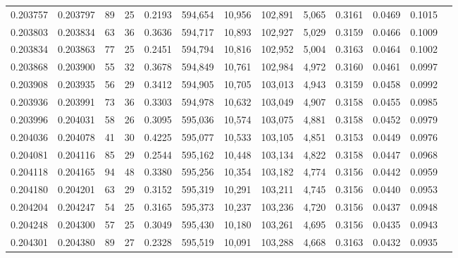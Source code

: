 \begin{tabular}{rrrrrrrrrrrrr}
0.203757 & 0.203797 &    89 &  25 &                                     0.2193 & 594,654 &  10,956 & 102,891 &   5,065 & 0.3161 & 0.0469 & 0.1015 \\
0.203803 & 0.203834 &    63 &  36 &                                     0.3636 & 594,717 &  10,893 & 102,927 &   5,029 & 0.3159 & 0.0466 & 0.1009 \\
0.203834 & 0.203863 &    77 &  25 &                                     0.2451 & 594,794 &  10,816 & 102,952 &   5,004 & 0.3163 & 0.0464 & 0.1002 \\
0.203868 & 0.203900 &    55 &  32 &                                     0.3678 & 594,849 &  10,761 & 102,984 &   4,972 & 0.3160 & 0.0461 & 0.0997 \\
0.203908 & 0.203935 &    56 &  29 &                                     0.3412 & 594,905 &  10,705 & 103,013 &   4,943 & 0.3159 & 0.0458 & 0.0992 \\
0.203936 & 0.203991 &    73 &  36 &                                     0.3303 & 594,978 &  10,632 & 103,049 &   4,907 & 0.3158 & 0.0455 & 0.0985 \\
0.203996 & 0.204031 &    58 &  26 &                                     0.3095 & 595,036 &  10,574 & 103,075 &   4,881 & 0.3158 & 0.0452 & 0.0979 \\
0.204036 & 0.204078 &    41 &  30 &                                     0.4225 & 595,077 &  10,533 & 103,105 &   4,851 & 0.3153 & 0.0449 & 0.0976 \\
0.204081 & 0.204116 &    85 &  29 &                                     0.2544 & 595,162 &  10,448 & 103,134 &   4,822 & 0.3158 & 0.0447 & 0.0968 \\
0.204118 & 0.204165 &    94 &  48 &                                     0.3380 & 595,256 &  10,354 & 103,182 &   4,774 & 0.3156 & 0.0442 & 0.0959 \\
0.204180 & 0.204201 &    63 &  29 &                                     0.3152 & 595,319 &  10,291 & 103,211 &   4,745 & 0.3156 & 0.0440 & 0.0953 \\
0.204204 & 0.204247 &    54 &  25 &                                     0.3165 & 595,373 &  10,237 & 103,236 &   4,720 & 0.3156 & 0.0437 & 0.0948 \\
0.204248 & 0.204300 &    57 &  25 &                                     0.3049 & 595,430 &  10,180 & 103,261 &   4,695 & 0.3156 & 0.0435 & 0.0943 \\
0.204301 & 0.204380 &    89 &  27 &                                     0.2328 & 595,519 &  10,091 & 103,288 &   4,668 & 0.3163 & 0.0432 & 0.0935 \\

\end{tabular}
